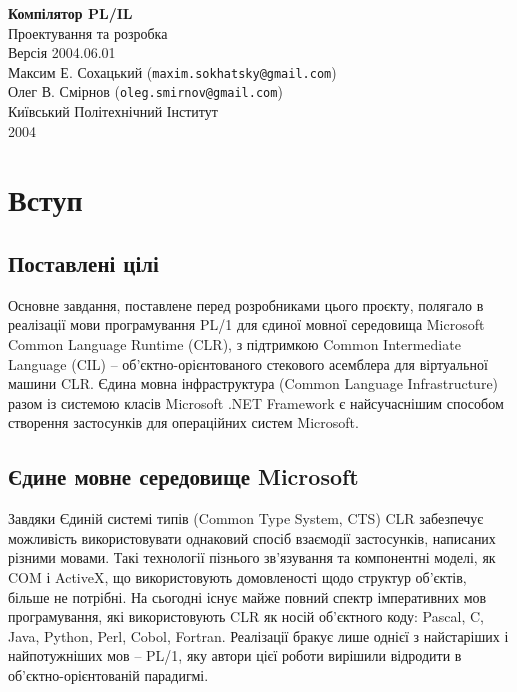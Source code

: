 \documentclass{memoir}
\begin{document}
\begin{center}
    \vspace*{3cm}
    {\Huge \textbf{Компілятор PL/IL}}\\[0.5cm]
    {\Large Проектування та розробка}\\[1cm]
    {\normalsize Версія 2004.06.01}\\[1cm]
    {\normalsize Максим Е. Сохацький (\texttt{maxim.sokhatsky@gmail.com})}\\
    {\normalsize Олег В. Смірнов (\texttt{oleg.smirnov@gmail.com})}\\[0.5cm]
    \vspace{5cm}
    {\normalsize Київський Політехнічний Інститут}\\
    {\normalsize 2004}
\end{center}

\newpage
\tableofcontents

\newpage

\chapter{Вступ}
\section{Поставлені цілі}
Основне завдання, поставлене перед розробниками цього проєкту,
полягало в реалізації мови програмування PL/1 для єдиної мовної
середовища Microsoft Common Language Runtime (CLR), з підтримкою
Common Intermediate Language (CIL) – об’єктно-орієнтованого стекового
асемблера для віртуальної машини CLR. Єдина мовна інфраструктура (Common
Language Infrastructure) разом із системою класів Microsoft .NET Framework
є найсучаснішим способом створення застосунків для операційних систем Microsoft.

\section{Єдине мовне середовище Microsoft}
Завдяки Єдиній системі типів (Common Type System, CTS) CLR забезпечує можливість
використовувати однаковий спосіб взаємодії застосунків, написаних різними мовами.
Такі технології пізнього зв’язування та компонентні моделі, як COM і ActiveX,
що використовують домовленості щодо структур об’єктів, більше не потрібні.
На сьогодні існує майже повний спектр імперативних мов програмування,
які використовують CLR як носій об’єктного коду: Pascal, C, Java, Python,
Perl, Cobol, Fortran. Реалізації бракує лише однієї з найстаріших і
найпотужніших мов – PL/1, яку автори цієї роботи вирішили відродити
в об’єктно-орієнтованій парадигмі.
\end{document}
